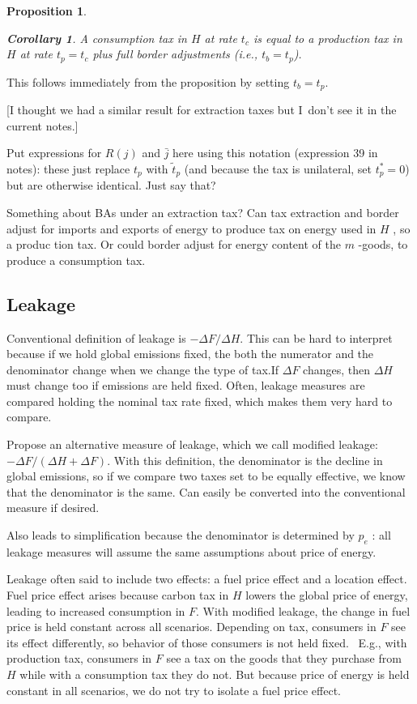 \documentclass[notitlepage,12pt]{article}
\newtheorem{corollary}[theorem]{Corollary}
\newtheorem{proposition}[theorem]{Proposition}
\begin{document}
\begin{proposition}
\begin{corollary}
A consumption tax in $H$ at rate $t_{c}$ is equal to a production tax in $H$
at rate $t_{p}=t_{c}$ plus full border adjustments (i.e., $t_{b}=t_{p}$).
\end{corollary}
\end{proposition}

This follows immediately from the proposition by setting $t_{b}=t_{p}$.

[I thought we had a similar result for extraction taxes but I\ don't see it
in the current notes.]

Put expressions for $R\left( j\right) $ and $\bar{j}$ here using this
notation (expression 39 in notes): these just replace $t_{p}$ with $\tilde{t}%
_{p}$ (and because the tax is unilateral, set $t_{p}^{\ast }=0$) but are
otherwise identical. Just say that?

Something about BAs under an extraction tax? Can tax extraction and border
adjust for imports and exports of energy to produce tax on energy used in $H$%
, so a produc tion tax. Or could border adjust for energy content of the $m$%
-goods, to produce a consumption tax.

\subsection{Leakage}

Conventional definition of leakage is $-\Delta F/\Delta H$. This can be hard
to interpret because if we hold global emissions fixed, the both the
numerator and the denominator change when we change the type of tax.If $%
\Delta F$ changes, then $\Delta H$ must change too if emissions are held
fixed. Often, leakage measures are compared holding the nominal tax rate
fixed, which makes them very hard to compare.

Propose an alternative measure of leakage, which we call modified leakage: $%
-\Delta F/\left( \Delta H+\Delta F\right) $. With this definition, the
denominator is the decline in global emissions, so if we compare two taxes
set to be equally effective, we know that the denominator is the same. Can
easily be converted into the conventional measure if desired.

Also leads to simplification because the denominator is determined by $p_{e}$%
: all leakage measures will assume the same assumptions about price of
energy.

Leakage often said to include two effects: a fuel price effect and a
location effect. Fuel price effect arises because carbon tax in $H$ lowers
the global price of energy, leading to increased consumption in $F$. With
modified leakage, the change in fuel price is held constant across all
scenarios. Depending on tax, consumers in $F$ see its effect differently, so
behavior of those consumers is not held fixed. \ E.g., with production tax,
consumers in $F$ see a tax on the goods that they purchase from $H$ while
with a consumption tax they do not. But because price of energy is held
constant in all scenarios, we do not try to isolate a fuel price effect.
\end{document}
